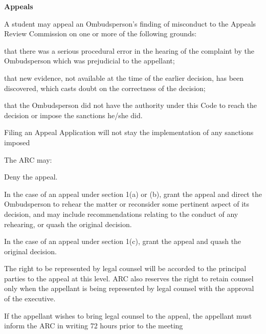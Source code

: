 \begin{longenum}[ label*=\arabic*., align=left]
\begin{longenum}[ label*=\arabic*., align=left]
       \end{longenum}
\item \textbf{Appeals}             
     \begin{longenum}[ label*=\arabic*., align=left]
		\item A  student  may  appeal  an  Ombudsperson's  finding  of  misconduct  to  the  Appeals  Review Commission on one or more of the following grounds:
		\begin{longenum}[ label*=\arabic*., align=left]
			\item that  there  was  a  serious  procedural  error  in  the  hearing  of  the  complaint  by  the Ombudsperson which was prejudicial to the appellant;
			\item that  new  evidence,  not  available  at  the  time  of  the  earlier  decision,  has  been discovered, which casts doubt on the correctness of the decision;
			\item that  the  Ombudsperson  did  not  have  the  authority  under  this  Code  to  reach  the decision or impose the sanctions he/she did.
            
      \end{longenum}

	\item Filing an Appeal Application will not stay the implementation of any sanctions imposed
    \item The ARC may:
		\begin{longenum}[ label*=\arabic*., align=left]
        \item Deny the appeal.
		\item In  the  case  of  an  appeal  under  section  1(a)  or  (b),  grant  the  appeal  and  direct  the Ombudsperson to rehear the matter or reconsider some pertinent aspect of its decision, and may include recommendations relating to the conduct of any rehearing, or quash the original decision.
		\item In the case of an appeal under section 1(c), grant the appeal and quash the original decision.
      \end{longenum}
	\item The  right  to  be  represented  by  legal  counsel  will  be  accorded  to  the  principal  parties  to  the appeal at this level. ARC also reserves the right to retain counsel only when the appellant is being represented by legal counsel with the approval of the executive.
    \begin{longenum}[ label*=\arabic*., align=left]
			\item If the appellant wishes to bring legal counsel to the appeal, the appellant must inform 
the ARC in writing 72 hours prior to the meeting


\end{longenum}
\end{longenum}
\end{longenum}
